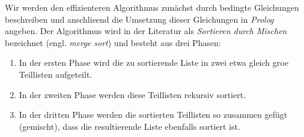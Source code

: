 Wir werden den effizienteren Algorithmus zun\"{a}chst durch bedingte Gleichungen beschreiben und
anschlie\3end die Umsetzung dieser Gleichungen in \textsl{Prolog} angeben.
Der Algorithmus wird in der Literatur als \emph{Sortieren durch Mischen} bezeichnet
(engl. \emph{merge sort}) und besteht aus drei Phasen:
\begin{enumerate}
\item In der ersten Phase wird die zu sortierende Liste in zwei etwa gleich gro\3e
      Teillisten aufgeteilt.
\item In der zweiten Phase werden diese Teillisten rekursiv sortiert.
\item In der dritten Phase werden die sortierten Teillisten so zusammen gef\"{u}gt (gemischt),
      dass die resultierende Liste ebenfalls sortiert ist.
\end{enumerate}

